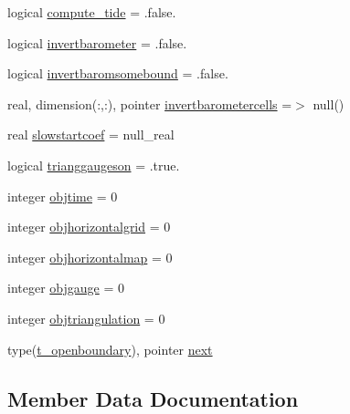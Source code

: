 \begin{DoxyCompactItemize}
\item 
logical \mbox{\hyperlink{structmoduleopenboundary_1_1t__openboundary_a57a6aa772336b1c8d079f5f049ed27d8}{compute\+\_\+tide}} = .false.
\item 
logical \mbox{\hyperlink{structmoduleopenboundary_1_1t__openboundary_ae2c4e4339aba2ab54b7d289257752015}{invertbarometer}} = .false.
\item 
logical \mbox{\hyperlink{structmoduleopenboundary_1_1t__openboundary_a8b338eeaedbd87f64111fd5771a8f6a2}{invertbaromsomebound}} = .false.
\item 
real, dimension(\+:,\+:), pointer \mbox{\hyperlink{structmoduleopenboundary_1_1t__openboundary_a2e545044e6fba144a4d2d883343bf6f0}{invertbarometercells}} =$>$ null()
\item 
real \mbox{\hyperlink{structmoduleopenboundary_1_1t__openboundary_a9e89760404929195e8af54cd2e2cd9c2}{slowstartcoef}} = null\+\_\+real
\item 
logical \mbox{\hyperlink{structmoduleopenboundary_1_1t__openboundary_a3b9184f3b78e627c070ef5a090b796f1}{trianggaugeson}} = .true.
\item 
integer \mbox{\hyperlink{structmoduleopenboundary_1_1t__openboundary_a5be80648785e5114e98a84ed31587152}{objtime}} = 0
\item 
integer \mbox{\hyperlink{structmoduleopenboundary_1_1t__openboundary_ae8e370d2dc9afc1626402bb9834f7884}{objhorizontalgrid}} = 0
\item 
integer \mbox{\hyperlink{structmoduleopenboundary_1_1t__openboundary_a83d9dec633fb3848d1bb6f16ab271548}{objhorizontalmap}} = 0
\item 
integer \mbox{\hyperlink{structmoduleopenboundary_1_1t__openboundary_a51b818c7db4138948e5c5a32c380cd2f}{objgauge}} = 0
\item 
integer \mbox{\hyperlink{structmoduleopenboundary_1_1t__openboundary_a732791c4f2a5167035976a58569dd181}{objtriangulation}} = 0
\item 
type(\mbox{\hyperlink{structmoduleopenboundary_1_1t__openboundary}{t\+\_\+openboundary}}), pointer \mbox{\hyperlink{structmoduleopenboundary_1_1t__openboundary_a6e8c32315583378c764f31b2e68cf872}{next}}
\end{DoxyCompactItemize}


\subsection{Member Data Documentation}
\mbox{\label{structmoduleopenboundary_1_1t__openboundary_a7c21fb434863d322a9670a6bd3344f0e}} 
